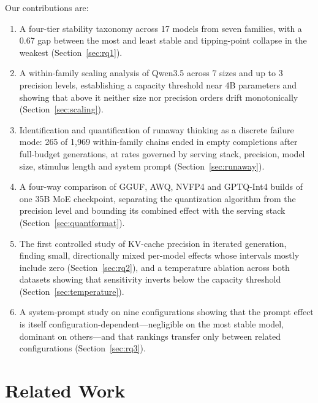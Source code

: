 \documentclass[11pt]{article}
\begin{document}
Our contributions are:
\begin{enumerate}[leftmargin=*]
  \item A four-tier stability taxonomy across 17 models from seven families,
        with a 0.67 gap between the most and least stable and tipping-point
        collapse in the weakest (Section~\ref{sec:rq1}).
  \item A within-family scaling analysis of Qwen3.5 across 7 sizes and up to
        3 precision levels, establishing a capacity threshold near 4B
        parameters and showing that above it neither size nor precision
        orders drift monotonically (Section~\ref{sec:scaling}).
  \item Identification and quantification of runaway thinking as a discrete
        failure mode: 265 of 1{,}969 within-family chains ended in
        empty completions after full-budget generations, at rates governed by
        serving stack, precision, model size, stimulus length and system
        prompt (Section~\ref{sec:runaway}).
  \item A four-way comparison of GGUF, AWQ, NVFP4 and GPTQ-Int4 builds of one
        35B MoE checkpoint, separating the quantization algorithm from the
        precision level and bounding its combined effect with the serving
        stack (Section~\ref{sec:quantformat}).
  \item The first controlled study of KV-cache precision in iterated
        generation, finding small, directionally mixed per-model effects
        whose intervals mostly include zero (Section~\ref{sec:rq2}), and a
        temperature ablation across both datasets showing that sensitivity
        inverts below the capacity threshold (Section~\ref{sec:temperature}).
  \item A system-prompt study on nine configurations showing that the prompt
        effect is itself configuration-dependent---negligible on the most
        stable model, dominant on others---and that rankings transfer only
        between related configurations (Section~\ref{sec:rq3}).
\end{enumerate}

\section{Related Work}
\label{sec:related}
\end{document}

